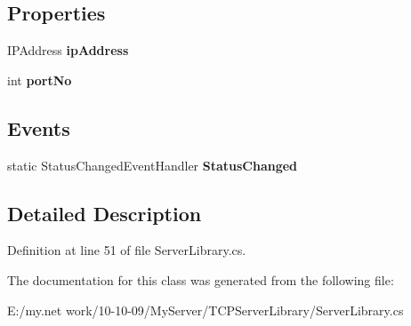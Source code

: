 \subsection*{Properties}
\begin{DoxyCompactItemize}
\item 
\hypertarget{class_server_library_1_1_t_c_p_server_a7e78d54f0e221f109799681b9ddcc834}{
IPAddress {\bfseries ipAddress}}
\label{class_server_library_1_1_t_c_p_server_a7e78d54f0e221f109799681b9ddcc834}

\item 
\hypertarget{class_server_library_1_1_t_c_p_server_a9636dbd48a5c7dc85acd1e84d88c7c88}{
int {\bfseries portNo}}
\label{class_server_library_1_1_t_c_p_server_a9636dbd48a5c7dc85acd1e84d88c7c88}

\end{DoxyCompactItemize}
\subsection*{Events}
\begin{DoxyCompactItemize}
\item 
\hypertarget{class_server_library_1_1_t_c_p_server_a19b6edb773d047a4eb5438a937999584}{
static StatusChangedEventHandler {\bfseries StatusChanged}}
\label{class_server_library_1_1_t_c_p_server_a19b6edb773d047a4eb5438a937999584}

\end{DoxyCompactItemize}


\subsection{Detailed Description}


Definition at line 51 of file ServerLibrary.cs.

The documentation for this class was generated from the following file:\begin{DoxyCompactItemize}
\item 
E:/my.net work/10-\/10-\/09/MyServer/TCPServerLibrary/ServerLibrary.cs\end{DoxyCompactItemize}
